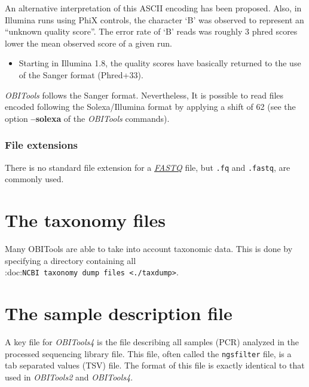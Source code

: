 \documentclass[
  letterpaper,
  DIV=11,
  numbers=noendperiod]{scrreprt}
\providecommand{\tightlist}{%
  \setlength{\itemsep}{0pt}\setlength{\parskip}{0pt}}\usepackage{longtable,booktabs,array}
\begin{document}
An alternative interpretation of this ASCII encoding has been proposed.
Also, in Illumina runs using PhiX controls, the character `B' was
observed to represent an ``unknown quality score''. The error rate of
`B' reads was roughly 3 phred scores lower the mean observed score of a
given run.

\begin{itemize}
\tightlist
\item
  Starting in Illumina 1.8, the quality scores have basically returned
  to the use of the Sanger format (Phred+33).
\end{itemize}

\emph{OBITools} follows the Sanger format. Nevertheless, It is possible
to read files encoded following the Solexa/Illumina format by applying a
shift of 62 (see the option \textbf{--solexa} of the \emph{OBITools}
commands).

\hypertarget{file-extensions-1}{%
\subsubsection{File extensions}\label{file-extensions-1}}

There is no standard file extension for a
\protect\hyperlink{sec-fastq}{\emph{FASTQ}} file, but \texttt{.fq} and
\texttt{.fastq}, are commonly used.

\hypertarget{the-taxonomy-files}{%
\section{The taxonomy files}\label{the-taxonomy-files}}

Many OBITools are able to take into account taxonomic data. This is done
by specifying a directory containing all
:doc:\texttt{NCBI\ taxonomy\ dump\ files\ \textless{}./taxdump\textgreater{}}.

\hypertarget{the-sample-description-file}{%
\section{The sample description
file}\label{the-sample-description-file}}

A key file for \emph{OBITools4} is the file describing all samples (PCR)
analyzed in the processed sequencing library file. This file, often
called the \texttt{ngsfilter} file, is a tab separated values (TSV)
file. The format of this file is exactly identical to that used in
\emph{OBITools2} and \emph{OBITools4}.
\end{document}
